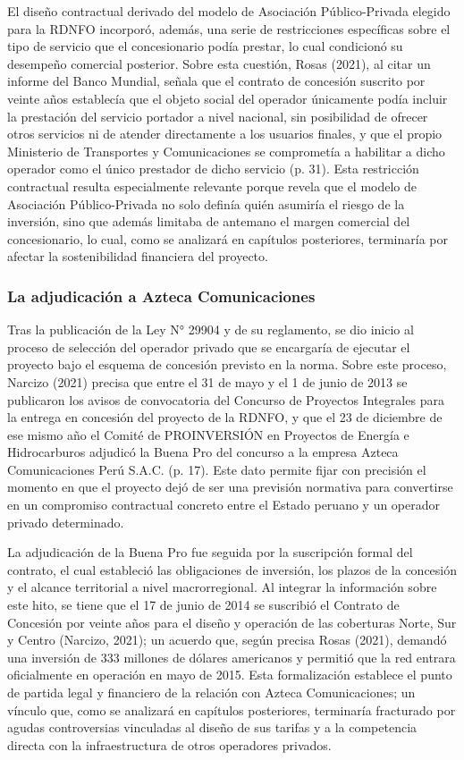 El diseño contractual derivado del modelo de Asociación Público-Privada elegido para la RDNFO incorporó, además, una serie de restricciones específicas sobre el tipo de servicio que el concesionario podía prestar, lo cual condicionó su desempeño comercial posterior. Sobre esta cuestión, Rosas (2021), al citar un informe del Banco Mundial, señala que el contrato de concesión suscrito por veinte años establecía que el objeto social del operador únicamente podía incluir la prestación del servicio portador a nivel nacional, sin posibilidad de ofrecer otros servicios ni de atender directamente a los usuarios finales, y que el propio Ministerio de Transportes y Comunicaciones se comprometía a habilitar a dicho operador como el único prestador de dicho servicio (p. 31). Esta restricción contractual resulta especialmente relevante porque revela que el modelo de Asociación Público-Privada no solo definía quién asumiría el riesgo de la inversión, sino que además limitaba de antemano el margen comercial del concesionario, lo cual, como se analizará en capítulos posteriores, terminaría por afectar la sostenibilidad financiera del proyecto.

\subsubsection{La adjudicación a Azteca Comunicaciones}
Tras la publicación de la Ley N° 29904 y de su reglamento, se dio inicio al proceso de selección del operador privado que se encargaría de ejecutar el proyecto bajo el esquema de concesión previsto en la norma. Sobre este proceso, Narcizo (2021) precisa que entre el 31 de mayo y el 1 de junio de 2013 se publicaron los avisos de convocatoria del Concurso de Proyectos Integrales para la entrega en concesión del proyecto de la RDNFO, y que el 23 de diciembre de ese mismo año el Comité de PROINVERSIÓN en Proyectos de Energía e Hidrocarburos adjudicó la Buena Pro del concurso a la empresa Azteca Comunicaciones Perú S.A.C. (p. 17). Este dato permite fijar con precisión el momento en que el proyecto dejó de ser una previsión normativa para convertirse en un compromiso contractual concreto entre el Estado peruano y un operador privado determinado.

La adjudicación de la Buena Pro fue seguida por la suscripción formal del contrato, el cual estableció las obligaciones de inversión, los plazos de la concesión y el alcance territorial a nivel macrorregional. Al integrar la información sobre este hito, se tiene que el 17 de junio de 2014 se suscribió el Contrato de Concesión por veinte años para el diseño y operación de las coberturas Norte, Sur y Centro (Narcizo, 2021); un acuerdo que, según precisa Rosas (2021), demandó una inversión de 333 millones de dólares americanos y permitió que la red entrara oficialmente en operación en mayo de 2015. Esta formalización establece el punto de partida legal y financiero de la relación con Azteca Comunicaciones; un vínculo que, como se analizará en capítulos posteriores, terminaría fracturado por agudas controversias vinculadas al diseño de sus tarifas y a la competencia directa con la infraestructura de otros operadores privados.

